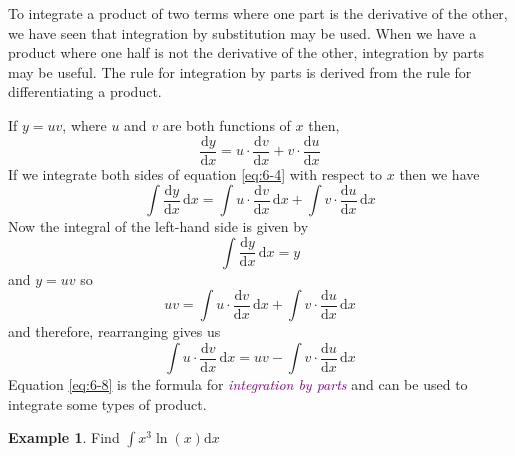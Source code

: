 \documentclass[
  english,
  11pt,
  oneside]{book}
\newcommand{\slide}{}
\theoremstyle{definition}
\theoremstyle{definition}
\newtheorem{example}{Example}[chapter]
\theoremstyle{definition}
\theoremstyle{definition}
\theoremstyle{remark}
\begin{document}
To integrate a product of two terms where one part is the derivative of the other, we have seen that integration by substitution may be used. When we have a product where one half is not the derivative of the other, integration by parts may be useful. The rule for integration by parts is derived from the rule for differentiating a product.

If \(y = uv\), where \(u\) and \(v\) are both functions of \(x\) then,
\begin{equation}
\frac{\mathrm{d}y}{\mathrm{d}x} = u\cdot\frac{\mathrm{d}v}{\mathrm{d}x} + v\cdot\frac{\mathrm{d}u}{\mathrm{d}x}
\label{eq:6-4}
\end{equation}
If we integrate both sides of equation \eqref{eq:6-4} with respect to \(x\) then we have
\begin{equation}
\int\frac{\mathrm{d}y}{\mathrm{d}x}\,\mathrm{d}x = \int u\cdot\frac{\mathrm{d}v}{\mathrm{d}x}\,\mathrm{d}x + \int v\cdot\frac{\mathrm{d}u}{\mathrm{d}x}\,\mathrm{d}x
\label{eq:6-5}
\end{equation}
Now the integral of the left-hand side is given by
\begin{equation}
\int\frac{\mathrm{d}y}{\mathrm{d}x}\,\mathrm{d}x = y
\label{eq:6-6}
\end{equation}
and \(y = uv\) so
\begin{equation}
uv =\int u\cdot\frac{\mathrm{d}v}{\mathrm{d}x}\,\mathrm{d}x +\int v\cdot\frac{\mathrm{d}u}{\mathrm{d}x}\,\mathrm{d}x
\label{eq:6-7}
\end{equation}
and therefore, rearranging gives us
\begin{equation}
\int u\cdot \frac{\mathrm{d}v}{\mathrm{d}x}\,\mathrm{d}x = uv -\int v\cdot\frac{\mathrm{d}u}{\mathrm{d}x}\,\mathrm{d}x
\label{eq:6-8}
\end{equation}
Equation \eqref{eq:6-8} is the formula for \textcolor{purple}{\em integration by parts} and can be used to integrate some types of
product.

\slide

\begin{example}
Find \(\displaystyle\int x^3\ln(x)\mathrm{d}x\)
\end{example}
\end{document}
